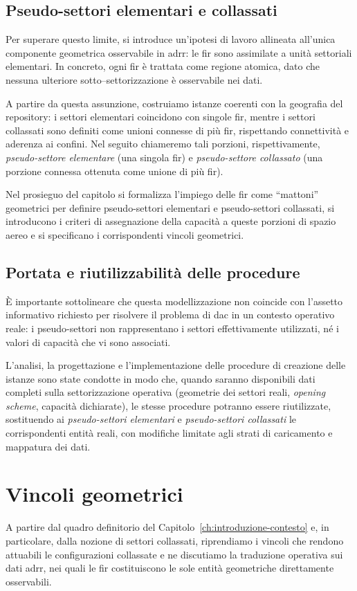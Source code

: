 \subsection{Pseudo-settori elementari e collassati}
Per superare questo limite, si introduce un’ipotesi di lavoro allineata all’unica componente geometrica osservabile in \gls{adrr}: le \gls{fir} sono assimilate a unità settoriali elementari. In concreto, ogni \gls{fir} è trattata come regione atomica, dato che nessuna ulteriore sotto–settorizzazione è osservabile nei dati.  

A partire da questa assunzione, costruiamo istanze coerenti con la geografia del repository: i settori elementari coincidono con singole \gls{fir}, mentre i settori collassati sono definiti  come unioni connesse di più \gls{fir}, rispettando connettività e aderenza ai confini. Nel seguito chiameremo tali porzioni, rispettivamente, \emph{pseudo-settore elementare} (una singola \gls{fir}) e \emph{pseudo-settore collassato} (una porzione connessa ottenuta come unione di più \gls{fir}).  

Nel prosieguo del capitolo si formalizza l’impiego delle \gls{fir} come ``mattoni'' geometrici per definire pseudo-settori elementari e pseudo-settori collassati, si introducono i criteri di assegnazione della capacità a queste porzioni di spazio aereo e si specificano i corrispondenti vincoli geometrici.

\subsection{Portata e riutilizzabilità delle procedure}
È importante sottolineare che questa modellizzazione non coincide con l’assetto informativo richiesto per risolvere il problema di \gls{dac} in un contesto operativo reale: i pseudo-settori non rappresentano i settori effettivamente utilizzati, né i valori di capacità che vi sono associati.    

L'analisi, la progettazione e l'implementazione delle procedure di creazione delle istanze sono state condotte in modo che, quando saranno disponibili dati completi sulla settorizzazione operativa (geometrie dei settori reali, \emph{opening scheme}, capacità dichiarate), le stesse procedure potranno essere riutilizzate, sostituendo ai \emph{pseudo-settori elementari} e \emph{pseudo-settori collassati} le corrispondenti entità reali, con modifiche limitate agli strati di caricamento e mappatura dei dati.

\section{Vincoli geometrici}
\label{sec:geometria}
A partire dal quadro definitorio del Capitolo~\ref{ch:introduzione-contesto} e, in particolare, dalla nozione di settori collassati, riprendiamo i vincoli che rendono attuabili le configurazioni collassate e ne discutiamo la traduzione operativa sui dati \gls{adrr}, nei quali le \gls{fir} costituiscono le sole entità geometriche direttamente osservabili.

